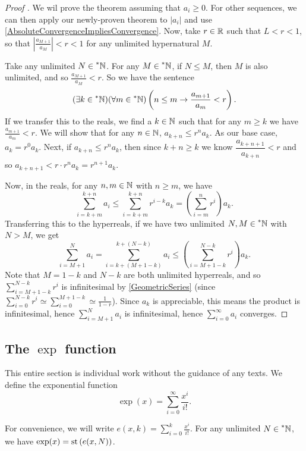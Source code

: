 \begin{proof}[Proof ]
    We wil prove the theorem assuming that $a_i \geq 0$. For other sequences, we can then apply our newly-proven theorem to $|a_i|$ and use \autoref{AbsoluteConvergenceImpliesConvergence}. Now, take $r \in \mathbb{R}$ such that $L < r < 1$, so that $\left|\frac{a_{M+1}}{a_M}\right| < r < 1$ for any unlimited hypernatural $M$.

    Take any unlimited $N \in \prescript{*}{}{\mathbb{N}}$. For any $M \in \prescript{*}{}{\mathbb{N}}$, if $N \leq M$, then $M$ is also unlimited, and so $\frac{a_{M+1}}{a_M} < r$. So we have the sentence
    \[ 
    (\exists k \in \prescript{*}{}{\mathbb{N}})(\forall m \in \prescript{*}{}{\mathbb{N}})\left(n \leq m \to \frac{a_{m+1}}{a_m} < r\right). 
    \]
    If we transfer this to the reals, we find a $k \in \mathbb{N}$ such that for any $m \geq k$ we have $\frac{a_{m+1}}{a_m} < r$. We will show that for any $n \in \mathbb{N}$, $a_{k+n} \leq r^n a_k$. As our base case, $a_k = r^0 a_k$. Next, if $a_{k+n} \leq r^n a_k$, then since $k+n \geq k$ we know $\dfrac{a_{k+n+1}}{a_{k+n}} < r$ and so $a_{k+n+1} < r \cdot r^n a_k = r^{n+1}a_k$.

    Now, in the reals, for any $n, m \in \mathbb{N}$ with $n \geq m$, we have 
    \[ 
    \sum_{i=k+m}^{k+n} a_i \leq \sum_{i=k+m}^{k+n} r^{i-k} a_k = \left(\sum_{i=m}^n r^i\right) a_k. 
    \]
    Transferring this to the hyperreals, if we have two unlimited $N, M \in \prescript{*}{}{\mathbb{N}}$ with $N > M$, we get
    \[ 
    \sum_{i=M+1}^N a_i = \sum_{i=k+(M+1-k)}^{k+(N-k)} a_i \leq \left(\sum_{i=M+1-k}^{N-k} r^i \right) a_k. 
    \]
    Note that $M=1-k$ and $N-k$ are both unlimited hyperreals, and so $\sum_{i=M+1-k}^{N-k} r^i$ is infinitesimal by \autoref{GeometricSeries} (since $\sum_{i=0}^{N-k} r^i \simeq \sum_{i=0}^{M+1-k} \simeq \frac{1}{1-r}$). Since $a_k$ is appreciable, this means the product is infinitesimal, hence $\sum_{i=M+1}^N a_i$ is infinitesimal, hence $\sum_{i=0}^\infty a_i$ converges.
\end{proof}

\subsection{The \texorpdfstring{$\exp$}{exp} function}
This entire section is individual work without the guidance of any texts. We define the exponential function \[\exp(x) = \sum_{i=0}^\infty \frac{x^i}{i!}.\]

For convenience, we will write $e(x, k) = \sum_{i=0}^k \frac{x^i}{i!}$. For any unlimited $N \in \prescript{*}{}{\mathbb{N}}$, we have $\exp(x) = \operatorname{st}\left(e(x, N)\right)$.

